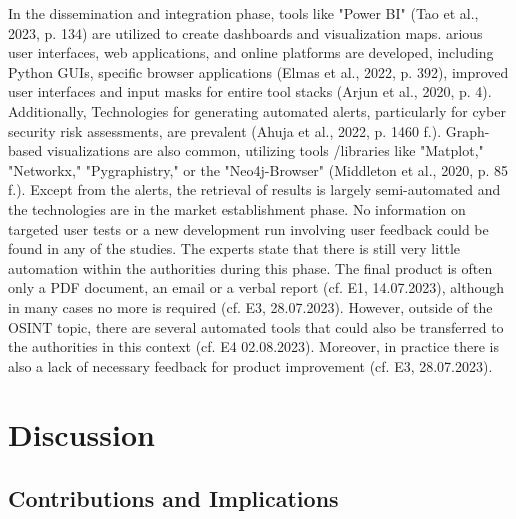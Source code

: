 \documentclass[10pt]{article}
\begin{document}
In the dissemination and integration phase, tools like "Power BI" (Tao et al., 2023, p. 134)
are utilized to create dashboards and visualization maps. arious user interfaces,
web applications, and online platforms are developed, including Python GUIs,
specific browser applications (Elmas et al., 2022, p. 392),
improved user interfaces and input masks for entire tool stacks (Arjun et al., 2020, p. 4).
Additionally, Technologies for generating automated alerts, particularly for cyber security risk assessments,
are prevalent (Ahuja et al., 2022, p. 1460 f.). Graph-based visualizations are also common, utilizing tools
/libraries like "Matplot," "Networkx," "Pygraphistry," or the "Neo4j-Browser" (Middleton et al., 2020, p. 85 f.).
Except from the alerts, the retrieval of results is largely semi-automated and the technologies are in the
market establishment phase. No information on targeted user tests or a new development run involving
user feedback could be found in any of the studies. The experts state that there is still very little
automation within the authorities during this phase. The final product is often only a PDF document,
an email or a verbal report (cf. E1, 14.07.2023), although in many cases no more is required (cf. E3, 28.07.2023).
However, outside of the OSINT topic, there are several automated tools that could also be transferred
to the authorities in this context (cf. E4 02.08.2023). Moreover, in practice there is also a lack of
necessary feedback for product improvement (cf. E3, 28.07.2023).

\section{Discussion}

\subsection{Contributions and Implications}
\end{document}

